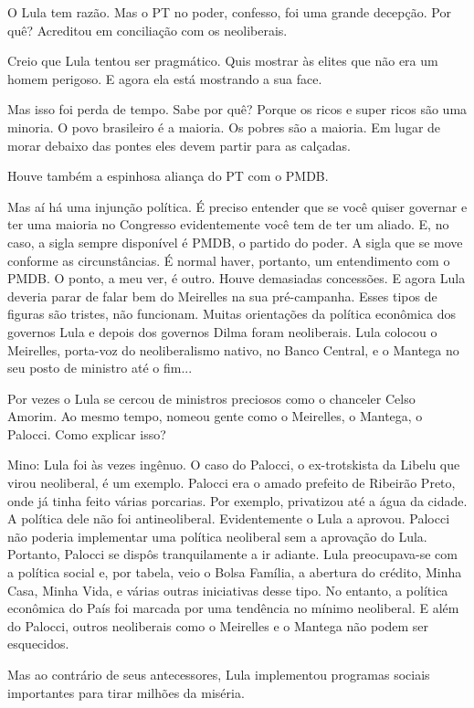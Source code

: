  O Lula tem razão. Mas o PT no poder, confesso, foi uma grande
decepção. Por quê? Acreditou em conciliação com os neoliberais.

 Creio que Lula tentou ser pragmático. Quis mostrar às elites que não
era um homem perigoso. E agora ela está mostrando a sua face.

 Mas isso foi perda de tempo. Sabe por quê? Porque os ricos e super
ricos são uma minoria. O povo brasileiro é a maioria. Os pobres são a
maioria. Em lugar de morar debaixo das pontes eles devem partir para as
calçadas.

 Houve também a espinhosa aliança do PT com o PMDB.

 Mas aí há uma injunção política. É preciso entender que se você
quiser governar e ter uma maioria no Congresso evidentemente você tem de
ter um aliado. E, no caso, a sigla sempre disponível é PMDB, o partido
do poder. A sigla que se move conforme as circunstâncias. É normal
haver, portanto, um entendimento com o PMDB. O ponto, a meu ver, é
outro. Houve demasiadas concessões. E agora Lula deveria parar de falar
bem do Meirelles na sua pré-campanha. Esses tipos de figuras são
tristes, não funcionam. Muitas orientações da política econômica dos
governos Lula e depois dos governos Dilma foram neoliberais. Lula
colocou o Meirelles, porta-voz do neoliberalismo nativo, no Banco
Central, e o Mantega no seu posto de ministro até o fim...

 Por vezes o Lula se cercou de ministros preciosos como o chanceler
Celso Amorim. Ao mesmo tempo, nomeou gente como o Meirelles, o Mantega,
o Palocci. Como explicar isso?

Mino: Lula foi às vezes ingênuo. O caso do Palocci, o ex-trotskista da
Libelu que virou neoliberal, é um exemplo. Palocci era o amado prefeito
de Ribeirão Preto, onde já tinha feito várias porcarias. Por exemplo,
privatizou até a água da cidade. A política dele não foi antineoliberal.
Evidentemente o Lula a aprovou. Palocci não poderia implementar uma
política neoliberal sem a aprovação do Lula. Portanto, Palocci se dispôs
tranquilamente a ir adiante. Lula preocupava-se com a política social e,
por tabela, veio o Bolsa Família, a abertura do crédito, Minha Casa,
Minha Vida, e várias outras iniciativas desse tipo. No entanto, a
política econômica do País foi marcada por uma tendência no mínimo
neoliberal. E além do Palocci, outros neoliberais como o Meirelles e o
Mantega não podem ser esquecidos.

 Mas ao contrário de seus antecessores, Lula implementou programas
sociais importantes para tirar milhões da miséria.

